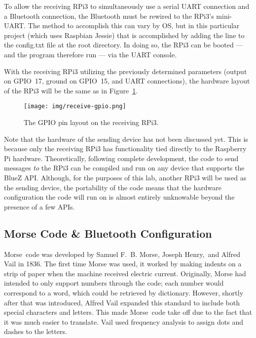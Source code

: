 \documentclass[11pt]{article}
\begin{document}
To allow the receiving RPi3 to simultaneously use a serial UART connection and a Bluetooth connection, the Bluetooth must be rewired to the RPi3's mini-UART.
The method to accomplish this can vary by OS, but in this particular project (which uses Raspbian Jessie) that is accomplished by adding the line  to the config.txt file at the root directory.
In doing so, the RPi3 can be booted --- and the program therefore run --- via the UART console.


With the receiving RPi3 utilizing the previously determined parameters (output on GPIO~17, ground on GPIO~15, and UART connections), the hardware layout of the RPi3 will be the same as in Figure~\ref{fig:receive-gpio}.


\begin{figure}[ht]
    \centering
    \texttt{[image: img/receive-gpio.png]}
    \caption{The GPIO pin layout on the receiving RPi3.}
    \label{fig:receive-gpio}
\end{figure}


Note that the hardware of the sending device has not been discussed yet.
This is because only the receiving RPi3 has functionality tied directly to the Raspberry Pi hardware.
Theoretically, following complete development, the code to send messages \emph{to} the RPi3 can be compiled and run on any device that supports the BlueZ API.
Although, for the purposes of this lab, another RPi3 will be used as the sending device, the portability of the code means that the hardware configuration the code will run on is almost entirely unknowable beyond the presence of a few APIs.


\subsection{Morse Code \& Bluetooth Configuration}
\label{sub:morse_code_&_bluetooth_configuration}


Morse~code was developed by Samuel F.~B. Morse, Joseph Henry,~and Alfred Vail in 1836.
The first time Morse was used, it worked by making indents on a strip of paper when the machine received electric current.
Originally, Morse had intended to only support numbers through the code; each number would correspond to a word, which could be retrieved by dictionary.
However, shortly after that was introduced, Alfred Vail expanded this standard to include both special characters and letters.
This made Morse~code take off due to the fact that it was much easier to translate.
Vail used frequency analysis to assign dots and dashes to the letters.
\end{document}
